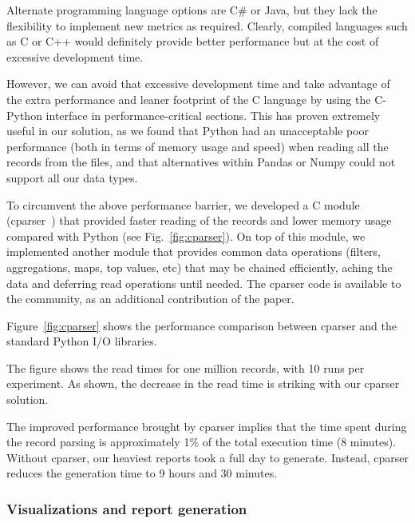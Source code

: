 \documentclass[AMA,STIX1COL]{WileyNJD-v2}
\begin{document}
Alternate programming language options are C\# or Java, but they lack the flexibility to implement new metrics as required.  Clearly, compiled languages such as C or C++ would definitely provide better performance but at the cost of excessive development time.  %

However, we can avoid that excessive development time and take advantage of the extra performance and leaner footprint of the C language by using the C-Python interface in performance-critical sections. This has proven extremely useful in our solution, as we found that Python had an unacceptable poor performance (both in terms of memory usage and speed) when reading all the records from the files, and that alternatives within Pandas or Numpy could not support all our data types.

To circumvent the above performance barrier, we developed a C module (\textsf{cparser}~\cite{cparser_web}) that provided faster reading of the records and lower memory usage compared with Python (see Fig.~\ref{fig:cparser}). On top of this module, we implemented another module that provides common data operations (filters, aggregations, maps, top values, etc) that may be chained efficiently, aching the data and deferring read operations until needed. The \textsf{cparser} code is available to the community, as an additional contribution of the paper. %

Figure~\ref{fig:cparser} shows the performance comparison between \textsf{cparser} and the standard Python I/O libraries. 

The figure shows the read times for one million records, with 10 runs per experiment. As shown, the decrease in the read time is striking with our \textsf{cparser} solution.  %

The improved performance brought by \textsf{cparser} implies that the time spent during the record parsing is approximately 1\% of the total execution time (8 minutes). Without \textsf{cparser}, our heaviest reports  took a full day to generate. Instead,  \textsf{cparser} reduces the generation time to 9 hours and 30 minutes.

\subsubsection{Visualizations and report generation}
\end{document}
